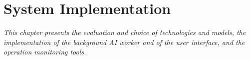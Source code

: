 \chapter{System Implementation}
\label{chapter:hienthuc}

\textit{This chapter presents the evaluation and choice of technologies and models, the implementation of the background AI worker and of the user interface, and the operation monitoring tools.}





